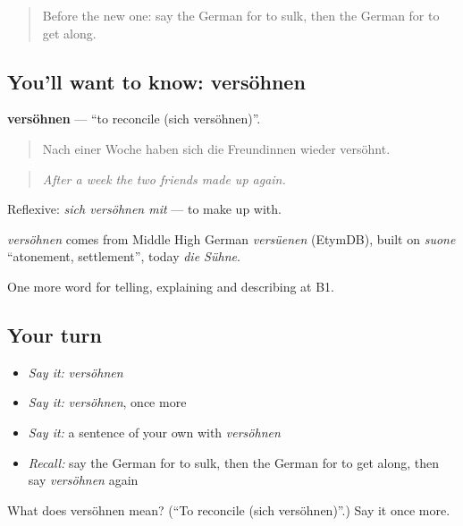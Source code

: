 \begin{quote}
Before the new one: say the German for to sulk, then the German for to get along.
\end{quote}

\subsection*{You'll want to know: versöhnen}
\textbf{versöhnen} — \textquotedblleft{}to reconcile (sich versöhnen)\textquotedblright{}.

\begin{quote}
Nach einer Woche haben sich die Freundinnen wieder versöhnt.
\end{quote}

\begin{quote}
\emph{After a week the two friends made up again.}
\end{quote}

Reflexive: \emph{sich versöhnen mit} — to make up with.

\begin{cousinweb}
\emph{versöhnen} comes from Middle High German \emph{versüenen} (EtymDB), built on \emph{suone} \textquotedblleft{}atonement, settlement\textquotedblright{}, today \emph{die Sühne}.
\end{cousinweb}

\begin{grammarlens}[title={What you've built}]
One more word for telling, explaining and describing at B1.
\end{grammarlens}

\subsection*{Your turn}
\begin{itemize}
\raggedright
  \item \emph{Say it:} \emph{versöhnen}
  \item \emph{Say it:} \emph{versöhnen}, once more
  \item \emph{Say it:} a sentence of your own with \emph{versöhnen}
  \item \emph{Recall:} say the German for to sulk, then the German for to get along, then say \emph{versöhnen} again
\end{itemize}

\begin{tcolorbox}[breakable,colback=teal!4,colframe=teal!35!black,title={Before you move on}]
What does versöhnen mean? (\textquotedblleft{}To reconcile (sich versöhnen)\textquotedblright{}.) Say it once more.
\end{tcolorbox}
